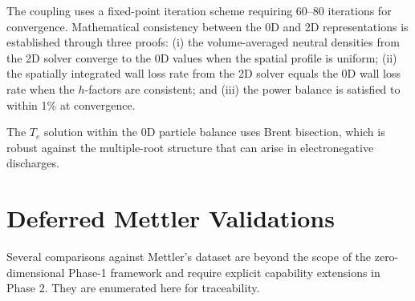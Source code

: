 \documentclass[11pt,a4paper]{report}
\newcommand{\Te}{T_e}
\begin{document}
The coupling uses a fixed-point iteration scheme requiring 60--80 iterations for convergence.  Mathematical consistency between the 0D and 2D representations is established through three proofs: (i) the volume-averaged neutral densities from the 2D solver converge to the 0D values when the spatial profile is uniform; (ii) the spatially integrated wall loss rate from the 2D solver equals the 0D wall loss rate when the $h$-factors are consistent; and (iii) the power balance is satisfied to within 1\% at convergence.

The $\Te$ solution within the 0D particle balance uses Brent bisection, which is robust against the multiple-root structure that can arise in electronegative discharges.

\section{Deferred Mettler Validations}
\label{sec:future_deferred}

Several comparisons against Mettler's dataset are beyond the scope of the zero-dimensional Phase-1 framework and require explicit capability extensions in Phase 2.  They are enumerated here for traceability.
\end{document}
